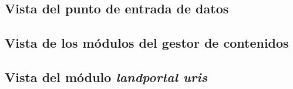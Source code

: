 \subsection{Vista del punto de entrada de datos}
\label{vista_receiver}



\subsection{Vista de los módulos del gestor de contenidos}
\label{vista_modulos_cms}


\subsection{Vista del módulo \textit{landportal uris}}
\label{vista_landportal_uris}
